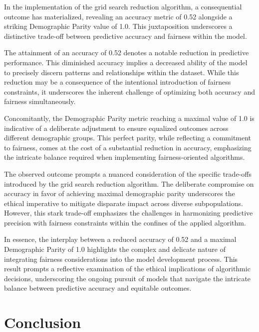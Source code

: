 \documentclass[12pt,a4paper,openright,twoside]{book}
\begin{document}
In the implementation of the grid search reduction algorithm, a consequential outcome has materialized, revealing an accuracy metric of 0.52 alongside a striking Demographic Parity value of 1.0. This juxtaposition underscores a distinctive trade-off between predictive accuracy and fairness within the model.

The attainment of an accuracy of 0.52 denotes a notable reduction in predictive performance. This diminished accuracy implies a decreased ability of the model to precisely discern patterns and relationships within the dataset. While this reduction may be a consequence of the intentional introduction of fairness constraints, it underscores the inherent challenge of optimizing both accuracy and fairness simultaneously.

Concomitantly, the Demographic Parity metric reaching a maximal value of 1.0 is indicative of a deliberate adjustment to ensure equalized outcomes across different demographic groups. This perfect parity, while reflecting a commitment to fairness, comes at the cost of a substantial reduction in accuracy, emphasizing the intricate balance required when implementing fairness-oriented algorithms.

The observed outcome prompts a nuanced consideration of the specific trade-offs introduced by the grid search reduction algorithm. The deliberate compromise on accuracy in favor of achieving maximal demographic parity underscores the ethical imperative to mitigate disparate impact across diverse subpopulations. However, this stark trade-off emphasizes the challenges in harmonizing predictive precision with fairness constraints within the confines of the applied algorithm.

In essence, the interplay between a reduced accuracy of 0.52 and a maximal Demographic Parity of 1.0 highlights the complex and delicate nature of integrating fairness considerations into the model development process. This result prompts a reflective examination of the ethical implications of algorithmic decisions, underscoring the ongoing pursuit of models that navigate the intricate balance between predictive accuracy and equitable outcomes.

\chapter{Conclusion}
\label{chap:conclusions}
\end{document}
